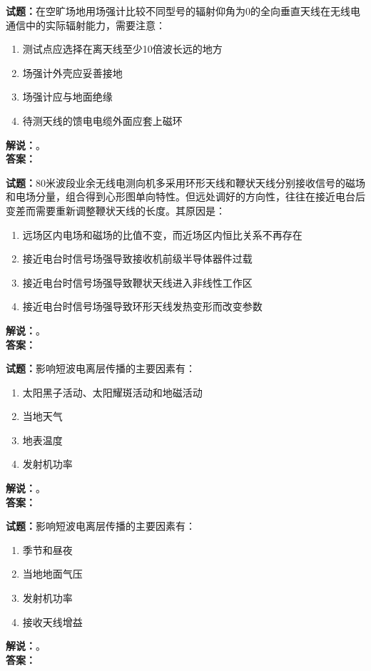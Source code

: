 \documentclass{ctexbook}
\begin{document}
\bigskip




\noindent\textbf{试题：}在空旷场地用场强计比较不同型号的辐射仰角为0的全向垂直天线在无线电通信中的实际辐射能力，需要注意：
\begin{enumerate}[leftmargin=3em]
\item 测试点应选择在离天线至少10倍波长远的地方
\item 场强计外壳应妥善接地
\item 场强计应与地面绝缘
\item 待测天线的馈电电缆外面应套上磁环
\end{enumerate}
\noindent\textbf{解说：}\textbf{}。\\\noindent\textbf{答案：}

\bigskip




\noindent\textbf{试题：}80米波段业余无线电测向机多采用环形天线和鞭状天线分别接收信号的磁场和电场分量，组合得到心形图单向特性。但远处调好的方向性，往往在接近电台后变差而需要重新调整鞭状天线的长度。其原因是：
\begin{enumerate}[leftmargin=3em]
\item 远场区内电场和磁场的比值不变，而近场区内恒比关系不再存在
\item 接近电台时信号场强导致接收机前级半导体器件过载
\item 接近电台时信号场强导致鞭状天线进入非线性工作区
\item 接近电台时信号场强导致环形天线发热变形而改变参数
\end{enumerate}
\noindent\textbf{解说：}\textbf{}。\\\noindent\textbf{答案：}

\bigskip




\noindent\textbf{试题：}影响短波电离层传播的主要因素有：
\begin{enumerate}[leftmargin=3em]
\item 太阳黑子活动、太阳耀斑活动和地磁活动
\item 当地天气
\item 地表温度
\item 发射机功率
\end{enumerate}
\noindent\textbf{解说：}\textbf{}。\\\noindent\textbf{答案：}

\bigskip




\noindent\textbf{试题：}影响短波电离层传播的主要因素有：
\begin{enumerate}[leftmargin=3em]
\item 季节和昼夜
\item 当地地面气压
\item 发射机功率
\item 接收天线增益
\end{enumerate}
\noindent\textbf{解说：}\textbf{}。\\\noindent\textbf{答案：}
\end{document}
